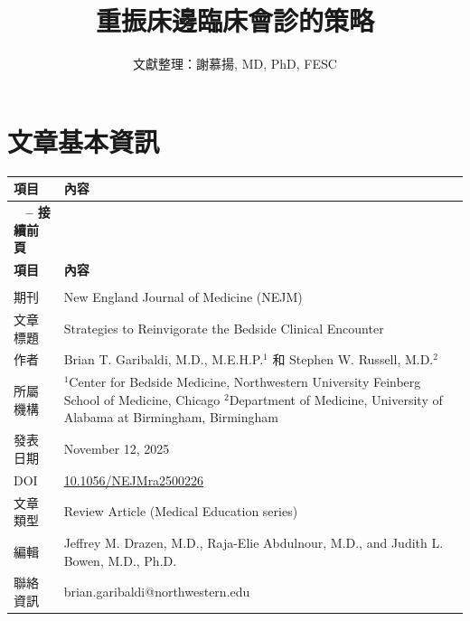 \documentclass[12pt,a4paper]{article}
\newcommand{\mydate}{\DTMtoday}
\begin{document}
\title{\textcolor{emergency_red}{重振床邊臨床會診的策略}}
\author{\textcolor{emergency_blue}{文獻整理：謝慕揚, MD, PhD, FESC}}
\date{\textcolor{emergency_gray}{\mydate}}
\maketitle

\section{文章基本資訊}

\begin{longtable}{>{\raggedright\arraybackslash}p{3cm} >{\raggedright\arraybackslash}p{12cm}}
\toprule
\textbf{\textcolor{emergency_red}{項目}} & \textbf{\textcolor{emergency_red}{內容}} \\
\midrule
\endfirsthead

\multicolumn{2}{c}%
{{\bfseries \tablename\ \thetable{} -- 接續前頁}} \\
\toprule
\textbf{\textcolor{emergency_red}{項目}} & \textbf{\textcolor{emergency_red}{內容}} \\
\midrule
\endhead

\midrule \multicolumn{2}{r}{{接續下頁}} \\ \midrule
\endfoot

\bottomrule
\endlastfoot

期刊 & New England Journal of Medicine (NEJM) \\
文章標題 & Strategies to Reinvigorate the Bedside Clinical Encounter \\
作者 & Brian T. Garibaldi, M.D., M.E.H.P.$^1$ 和 Stephen W. Russell, M.D.$^2$ \\
所屬機構 & $^1$Center for Bedside Medicine, Northwestern University Feinberg School of Medicine, Chicago \newline $^2$Department of Medicine, University of Alabama at Birmingham, Birmingham \\
發表日期 & November 12, 2025 \\
DOI & \href{https://doi.org/10.1056/NEJMra2500226}{10.1056/NEJMra2500226} \\
文章類型 & Review Article (Medical Education series) \\
編輯 & Jeffrey M. Drazen, M.D., Raja-Elie Abdulnour, M.D., and Judith L. Bowen, M.D., Ph.D. \\
聯絡資訊 & brian.garibaldi@northwestern.edu \\
\end{longtable}
\end{document}
